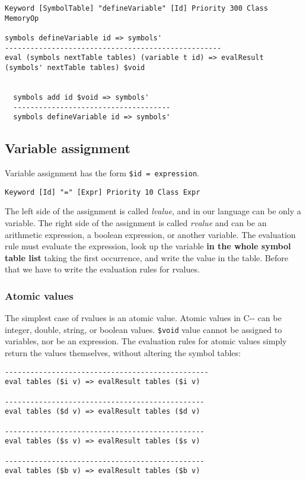 \begin{lstlisting}
Keyword [SymbolTable] "defineVariable" [Id] Priority 300 Class MemoryOp

symbols defineVariable id => symbols'
---------------------------------------------------
eval (symbols nextTable tables) (variable t id) => evalResult (symbols' nextTable tables) $void


  symbols add id $void => symbols'
  -------------------------------------
  symbols defineVariable id => symbols'
\end{lstlisting}

\subsection{Variable assignment}
Variable assignment has the form \texttt{\$id = expression}. 

\begin{lstlisting}
Keyword [Id] "=" [Expr] Priority 10 Class Expr
\end{lstlisting}

\noindent
The left side of the assignment is called \textit{lvalue}, and in our language can be only a variable. The right side of the assignment is called \textit{rvalue} and can be an arithmetic expression, a boolean expression, or another variable. The evaluation rule must evaluate the expression, look up the variable \textbf{in the whole symbol table list} taking the first occurrence, and write the value in the table. Before that we have to write the evaluation rules for rvalues.

\subsubsection{Atomic values}
The simplest case of rvalues is an atomic value. Atomic values in C-{}- can be integer, double, string, or boolean values. \texttt{\$void} value cannot be assigned to variables, nor be an expression. The evaluation rules for atomic values simply return the values themselves, without altering the symbol tables:

\begin{lstlisting}
------------------------------------------------
eval tables ($i v) => evalResult tables ($i v)

-----------------------------------------------
eval tables ($d v) => evalResult tables ($d v)

-----------------------------------------------
eval tables ($s v) => evalResult tables ($s v)

-----------------------------------------------
eval tables ($b v) => evalResult tables ($b v)
\end{lstlisting}

